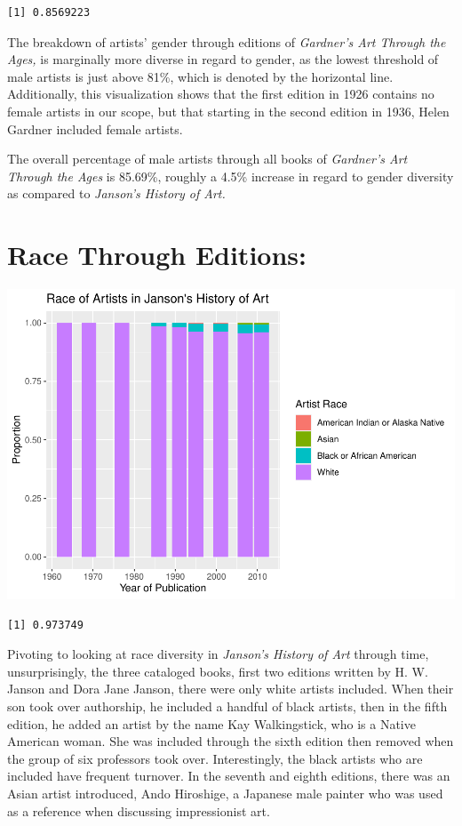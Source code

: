 \documentclass[
  letterpaper,
  DIV=11,
  numbers=noendperiod]{scrreprt}
\begin{document}
\begin{verbatim}
[1] 0.8569223
\end{verbatim}

The breakdown of artists' gender through editions of \emph{Gardner's Art
Through the Ages,} is marginally more diverse in regard to gender, as
the lowest threshold of male artists is just above 81\%, which is
denoted by the horizontal line. Additionally, this visualization shows
that the first edition in 1926 contains no female artists in our scope,
but that starting in the second edition in 1936, Helen Gardner included
female artists.

The overall percentage of male artists through all books of
\emph{Gardner's Art Through the Ages} is 85.69\%, roughly a 4.5\%
increase in regard to gender diversity as compared to \emph{Janson's
History of Art.}

\hypertarget{race-through-editions}{%
\section{\texorpdfstring{\textbf{Race Through
Editions:}}{Race Through Editions:}}\label{race-through-editions}}

\includegraphics{Chapter1/Chapter1_files/figure-pdf/jansonracethroughtime-1.pdf}

\begin{verbatim}
[1] 0.973749
\end{verbatim}

Pivoting to looking at race diversity in \emph{Janson's History of Art}
through time, unsurprisingly, the three cataloged books, first two
editions written by H. W. Janson and Dora Jane Janson, there were only
white artists included. When their son took over authorship, he included
a handful of black artists, then in the fifth edition, he added an
artist by the name Kay Walkingstick, who is a Native American woman. She
was included through the sixth edition then removed when the group of
six professors took over. Interestingly, the black artists who are
included have frequent turnover. In the seventh and eighth editions,
there was an Asian artist introduced, Ando Hiroshige, a Japanese male
painter who was used as a reference when discussing impressionist art.
\end{document}
